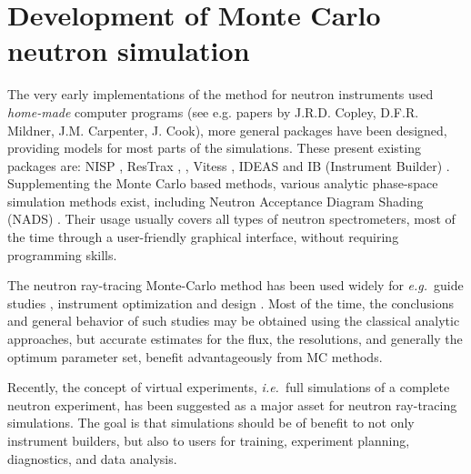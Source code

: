 \section{Development of Monte Carlo neutron simulation}
The very early implementations of the method for neutron instruments used \emph{home-made} computer programs  (see e.g. papers by J.R.D. Copley, D.F.R. Mildner, J.M. Carpenter, J. Cook), more general packages have been designed, providing models for most parts of the simulations.
These present existing packages are: NISP \cite{NISP}, ResTrax
\cite{Restrax}, \MCS\cite{mcs_ppf,nn_10_20,mcstas_pb,mcs_ppf,mcstas_webpage},
Vitess \cite{Vitess,vitess_webpage}, IDEAS \cite{IDEAS} and IB (Instrument
Builder) \cite{IB_webpage}. Supplementing the Monte Carlo based
methods, various analytic phase-space simulation methods exist,
including Neutron Acceptance Diagram Shading (NADS) \cite{NADS_webpage}.
Their usage usually covers all types of neutron spectrometers, most of the time through a user-friendly graphical interface, without requiring programming skills.

The neutron ray-tracing Monte-Carlo method has been used widely for
{\em e.g.}\ guide studies \cite{Copley93,Farhi02,Schanzer04},
instrument optimization and design \cite{Zsigmond04,Lieutenant05}.
Most of the time, the conclusions and general behavior of such studies
may be obtained using the classical analytic approaches,
but accurate estimates for the flux, the resolutions,
and generally the optimum parameter set, benefit advantageously from MC methods.

Recently, the concept of virtual experiments, {\em i.e.}\ full simulations
of a complete neutron experiment, has been suggested as a major asset for neutron ray-tracing simulations. The goal is that
simulations should be of benefit to not only instrument builders, but also
to users for training, experiment planning, diagnostics, and data
analysis.

